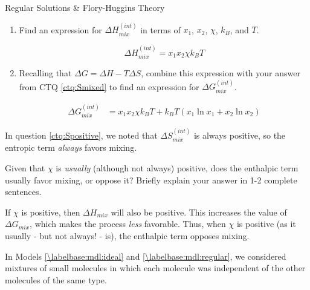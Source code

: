 \begin{activity}{Regular Solutions \& Flory-Huggins Theory}
\begin{ctqs}
		\begin{enumerate}
			\item Find an expression for $\Delta H_{mix}^{(int)}$ in terms of $x_1$, $x_2$, $\chi$, $k_B$, and $T$.
		
			\begin{solution}[0.5in]{}
				\begin{equation*}
					\Delta H_{mix}^{(int)} = x_1 x_2 \chi k_B T
				\end{equation*}
			\end{solution}

			\item Recalling that $\Delta G = \Delta H - T\Delta S$, combine this expression with your answer from CTQ \ref{ctq:Smixed} to find an expression for $\Delta G_{mix}^{(int)}$.
			
			\begin{solution}[0.5in]{}
				\begin{align*}
					\Delta G_{mix}^{(int)} &= x_1 x_2 \chi k_B T + k_B T(x_1 \ln x_1 + x_2 \ln x_2)
				\end{align*}
			\end{solution}
		\end{enumerate}
			
		\question In question \ref{ctq:Spositive}, we noted that $\Delta S_{mix}^{(int)}$ is always positive, so the entropic term \emph{always} favors mixing.
		
			Given that $\chi$ is \emph{usually} (although not always) positive, does the enthalpic term usually favor mixing, or oppose it?  Briefly explain your answer in 1-2 complete sentences.
			
			\begin{solution}[2.5in]{}
			
				If $\chi$ is positive, then $\Delta H_{mix}$ will also be positive.  This increases the value of $\Delta G_{mix}$, which makes the process \emph{less} favorable.    Thus, when $\chi$ is positive (as it usually - but not always! - is), the enthalpic term opposes mixing.
				
			\end{solution}
\end{ctqs}

\begin{model}
\label{\labelbase:mdl:floryhuggins}

In Models \ref{\labelbase:mdl:ideal} and \ref{\labelbase:mdl:regular}, we considered mixtures of small molecules in which each molecule  was independent of the other molecules of the same type.


\end{model}
\end{activity}
